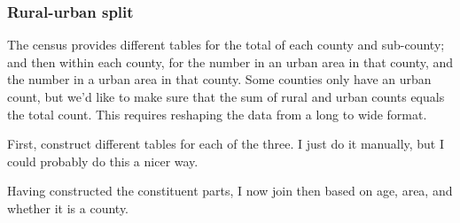 \documentclass[
]{book}
\newenvironment{Shaded}{\begin{snugshade}}{\end{snugshade}}
\newcommand{\CommentTok}[1]{\textcolor[rgb]{0.56,0.35,0.01}{\textit{#1}}}
\newcommand{\DecValTok}[1]{\textcolor[rgb]{0.00,0.00,0.81}{#1}}
\newcommand{\KeywordTok}[1]{\textcolor[rgb]{0.13,0.29,0.53}{\textbf{#1}}}
\newcommand{\NormalTok}[1]{#1}
\newcommand{\OperatorTok}[1]{\textcolor[rgb]{0.81,0.36,0.00}{\textbf{#1}}}
\newcommand{\StringTok}[1]{\textcolor[rgb]{0.31,0.60,0.02}{#1}}
\begin{document}
\hypertarget{rural-urban-split}{%
\subsubsection{Rural-urban split}\label{rural-urban-split}}

The census provides different tables for the total of each county and sub-county; and then within each county, for the number in an urban area in that county, and the number in a urban area in that county. Some counties only have an urban count, but we'd like to make sure that the sum of rural and urban counts equals the total count. This requires reshaping the data from a long to wide format.

First, construct different tables for each of the three. I just do it manually, but I could probably do this a nicer way.

\begin{Shaded}
\end{Shaded}

Having constructed the constituent parts, I now join then based on age, area, and whether it is a county.
\end{document}
